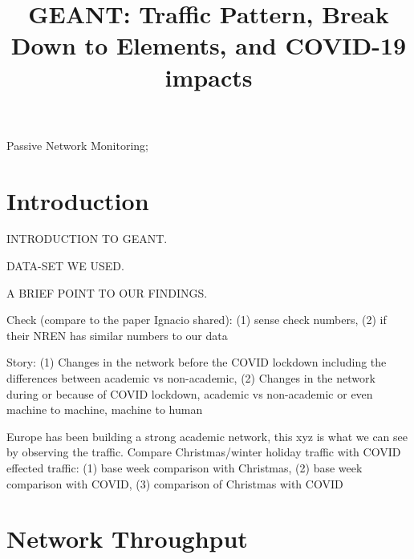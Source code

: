 \documentclass[10pt, journal, letterpaper]{IEEEtran}
\begin{document}
\title{GEANT: Traffic Pattern, Break Down to Elements, and COVID-19 impacts}
\author{}
\maketitle	
\begin{abstract}
\end{abstract}	
\begin{IEEEkeywords} 
    Passive Network Monitoring;
\end{IEEEkeywords}

\section{Introduction}
INTRODUCTION TO GEANT.

DATA-SET WE USED.

A BRIEF POINT TO OUR FINDINGS.

Check (compare to the paper Ignacio shared): (1) sense check numbers, (2) if their NREN has similar numbers to our data

Story: (1) Changes in the network before the COVID lockdown including the differences between academic vs non-academic, (2) Changes in the network during or because of COVID lockdown, academic vs non-academic or even machine to machine, machine to human

Europe has been building a strong academic network, this xyz is what we can see by observing the traffic. Compare Christmas/winter holiday traffic with COVID effected traffic: (1) base week comparison with Christmas, (2) base week comparison with COVID, (3) comparison of Christmas with COVID

\section{Network Throughput}
\end{document}
